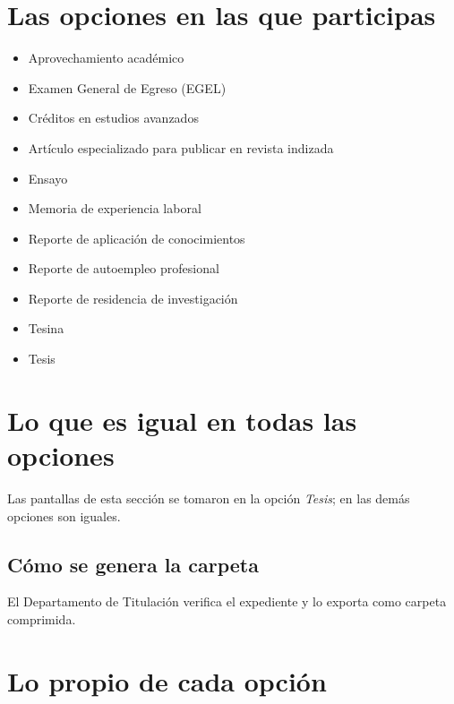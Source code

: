 \section{Las opciones en las que participas}
\begin{itemize}
  \item Aprovechamiento académico
  \item Examen General de Egreso (EGEL)
  \item Créditos en estudios avanzados
  \item Artículo especializado para publicar en revista indizada
  \item Ensayo
  \item Memoria de experiencia laboral
  \item Reporte de aplicación de conocimientos
  \item Reporte de autoempleo profesional
  \item Reporte de residencia de investigación
  \item Tesina
  \item Tesis
\end{itemize}
\section{Lo que es igual en todas las opciones}
Las pantallas de esta sección se tomaron en la opción \emph{Tesis}; en las demás opciones son iguales.
\subsection{Cómo se genera la carpeta}
El Departamento de Titulación verifica el expediente y lo exporta como carpeta comprimida.
\section{Lo propio de cada opción}
